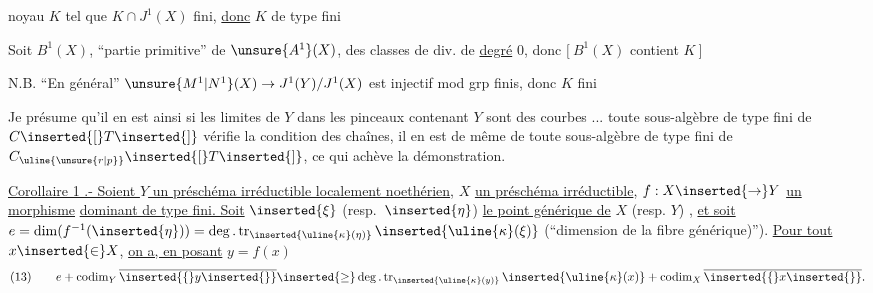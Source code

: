 noyau $K$ tel que $K\cap J^1(X)$ fini,
\uline{donc} $K$ de type fini

Soit $B^1(X)$, ``partie primitive'' de $\unsure{A^1}(X)$,  des classes de div. de \uline{degré} $0$, donc
$[\ B^1(X)$ contient $K\ ]$



N.B. ``En général'' $\unsure{M^1|N^1}(X)\to J^1(Y)/J^1(X)$ est injectif mod grp finis, donc $K$ fini

Je présume qu'il en est ainsi si les  limites de $Y$ dans les pinceaux  contenant $Y$ sont des courbes ...
toute sous-algèbre de type fini de $C\inserted{[}T\inserted{]}$ vérifie la condition des chaînes, il en est de même de toute sous-algèbre de type fini de $C_{\uline{\unsure{r|p}}}\inserted{[}T\inserted{]}$, ce qui achève la démonstration.


\uline{Corollaire 1 .- Soient $Y$ un préschéma irréductible localement noethérien}, $X$ \uline{un préschéma irréductible}, $f:X\inserted{\to}Y$ \uline{un morphisme}  \uline{dominant de type fini. Soit} $\inserted{\xi}$ (resp.\ $\inserted{\eta}$) \uline{le point générique de} $X$ (resp. $Y$) , \uline{et soit} $e=\dim(f^{-1}(\inserted{\eta}))=\deg.\operatorname{tr}_{\inserted{\uline{\kappa}(\eta)}}\inserted{\uline{\kappa}(\xi)}$ (``dimension de la fibre générique)''). \uline{Pour tout} $x\inserted{\in}X$, \uline{on a, en posant} $y=f(x)$
\[
(13)\qquad e+\operatorname{codim}_Y\overline{\inserted{\{}y\inserted{\}}}\inserted{\geq}\deg.\operatorname{tr}_{\inserted{\uline{\kappa}(y)}}\inserted{\uline{\kappa}(x)}+\operatorname{codim}_X\overline{\inserted{\{}x\inserted{\}}}.
\]

